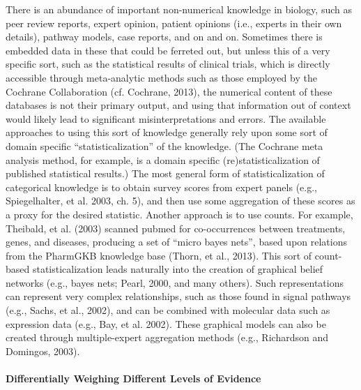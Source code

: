 \documentclass[12pt]{article}
\begin{document}
There is an abundance of important non-numerical knowledge in biology,
such as peer review reports, expert opinion, patient opinions (i.e.,
experts in their own details), pathway models, case reports, and on
and on. Sometimes there is embedded data in these that could be
ferreted out, but unless this of a very specific sort, such as the
statistical results of clinical trials, which is directly accessible
through meta-analytic methods such as those employed by the Cochrane
Collaboration (cf. Cochrane, 2013), the numerical content of these
databases is not their primary output, and using that information out
of context would likely lead to significant misinterpretations and
errors. The available approaches to using this sort of knowledge
generally rely upon some sort of domain specific “statisticalization”
of the knowledge. (The Cochrane meta analysis method, for example, is
a domain specific (re)statisticalization of published statistical
results.) The most general form of statisticalization of categorical
knowledge is to obtain survey scores from expert panels (e.g.,
Spiegelhalter, et al. 2003, ch. 5), and then use some aggregation of
these scores as a proxy for the desired statistic. Another approach is
to use counts. For example, Theibald, et al. (2003) scanned pubmed for
co-occurrences between treatments, genes, and diseases, producing a
set of “micro bayes nets”, based upon relations from the PharmGKB
knowledge base (Thorn, et al., 2013). This sort of count-based
statisticalization leads naturally into the creation of graphical
belief networks (e.g., bayes nets; Pearl, 2000, and many others). Such
representations can represent very complex relationships, such as
those found in signal pathways (e.g., Sachs, et al., 2002), and can be
combined with molecular data such as expression data (e.g., Bay, et
al. 2002). These graphical models can also be created through
multiple-expert aggregation methods (e.g., Richardson and Domingos,
2003).

\paragraph*{Differentially Weighing Different Levels of Evidence}
\end{document}

